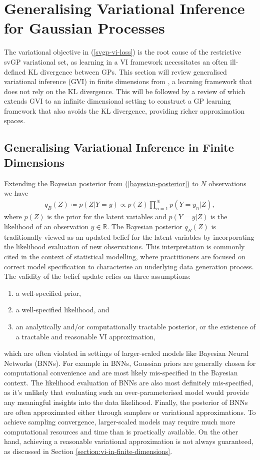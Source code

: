\documentclass{article}
\numberwithin{equation}{section}
\begin{document}
\newpage
\section{Generalising Variational Inference for Gaussian Processes}
The variational objective in (\ref{svgp-vi-loss}) is the root cause of the restrictive svGP variational set, as learning in a VI framework necessitates an often ill-defined KL divergence between GPs.
This section will review generalised variational inference (GVI) in finite dimensions from \cite{knoblauch2022optimization}, a learning framework that does not rely on the KL divergence.
This will be followed by a review of \cite{wild2022generalized} which extends GVI to an infinite dimensional setting to construct a GP learning framework that also avoids the KL divergence, providing richer approximation spaces.

\subsection{Generalising Variational Inference in Finite Dimensions}
Extending the Bayesian posterior from (\ref{bayesian-posterior}) to $N$ observations we have
\begin{align}
    \label{bayesian-posterior-gvi}
    q_B(Z) \coloneqq p(Z\vert Y=y) \propto p(Z) \prod_{n=1}^N p(Y=y_n \vert Z),
\end{align}
where $p(Z)$ is the prior for the latent variables and $p(Y=y \vert Z)$ is the likelihood of an observation $y \in \mathbb{R}$.
The Bayesian posterior $q_B(Z)$ is traditionally viewed as an updated belief for the latent variables by incorporating the likelihood evaluation of new observations.
This interpretation is commonly cited in the context of statistical modelling, where practitioners are focused on correct model specification to characterise an underlying data generation process. The validity of the belief update relies on three assumptions:
\begin{enumerate}
    \item a well-specified prior,
    \item a well-specified likelihood, and
    \item an analytically and/or computationally tractable posterior, or the existence of a tractable and reasonable VI approximation,
\end{enumerate}
which are often violated in settings of larger-scaled models like Bayesian Neural Networks (BNNs).
For example in BNNs, Gaussian priors are generally chosen for computational convenience and are most likely mis-specified in the Bayesian context.
The likelihood evaluation of BNNs are also most definitely mis-specified, as it's unlikely that evaluating such an over-parameterised model would provide any meaningful insights into the data likelihood.
Finally, the posterior of BNNs are often approximated either through samplers or variational approximations.
To achieve sampling convergence, larger-scaled models may require much more computational resources and time than is practically available.
On the other hand, achieving a reasonable variational approximation is not always guaranteed, as discussed in Section \ref{section:vi-in-finite-dimensions}.
\end{document}
